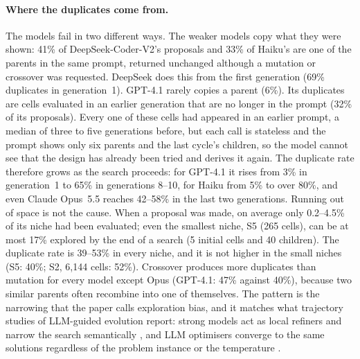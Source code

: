 \paragraph{Where the duplicates come from.} The models fail in two different ways. The weaker models copy what they were shown: 41\% of DeepSeek-Coder-V2's proposals and 33\% of Haiku's are one of the parents in the same prompt, returned unchanged although a mutation or crossover was requested. DeepSeek does this from the first generation (69\% duplicates in generation~1). GPT-4.1 rarely copies a parent (6\%). Its duplicates are cells evaluated in an earlier generation that are no longer in the prompt (32\% of its proposals). Every one of these cells had appeared in an earlier prompt, a median of three to five generations before, but each call is stateless and the prompt shows only six parents and the last cycle's children, so the model cannot see that the design has already been tried and derives it again. The duplicate rate therefore grows as the search proceeds: for GPT-4.1 it rises from 3\% in generation~1 to 65\% in generations 8--10, for Haiku from 5\% to over 80\%, and even Claude Opus~5.5 reaches 42--58\% in the last two generations. Running out of space is not the cause. When a proposal was made, on average only 0.2--4.5\% of its niche had been evaluated; even the smallest niche, S5 (265 cells), can be at most 17\% explored by the end of a search (5 initial cells and 40 children). The duplicate rate is 39--53\% in every niche, and it is not higher in the small niches (S5: 40\%; S2, 6{,}144 cells: 52\%). Crossover produces more duplicates than mutation for every model except Opus (GPT-4.1: 47\% against 40\%), because two similar parents often recombine into one of themselves. The pattern is the narrowing that the paper calls exploration bias, and it matches what trajectory studies of LLM-guided evolution report: strong models act as local refiners and narrow the search semantically \cite{zhang26traj}, and LLM optimisers converge to the same solutions regardless of the problem instance or the temperature \cite{redko26}.

